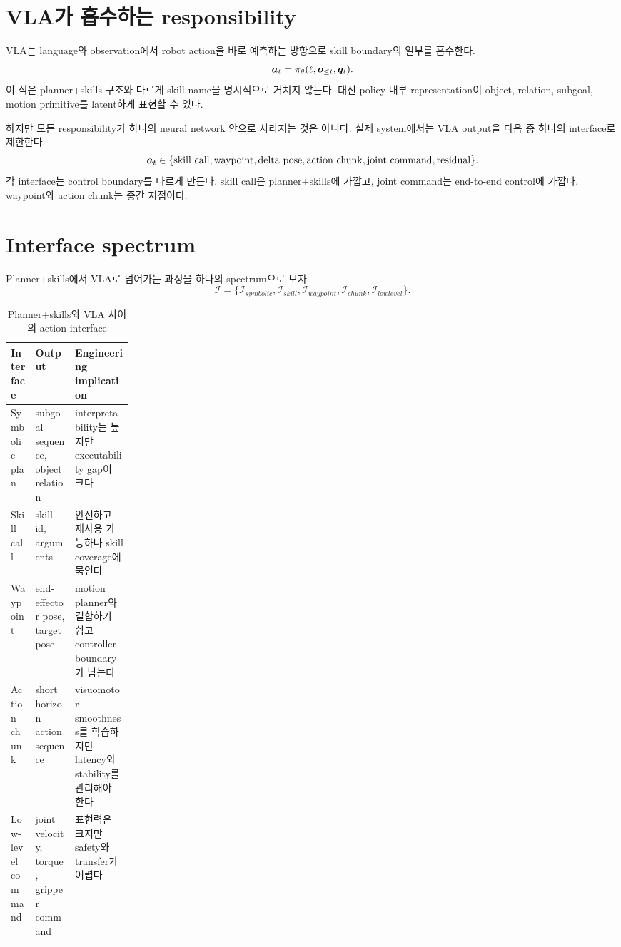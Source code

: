 \section{VLA가 흡수하는 responsibility}

VLA는 language와 observation에서 robot action을 바로 예측하는 방향으로 skill boundary의 일부를 흡수한다.
\begin{equation}
  \bm{a}_t
  =
  \pi_{\theta}(\ell,\bm{o}_{\leq t},\bm{q}_t).
  \label{eq:vla-policy-direct}
\end{equation}
이 식은 planner+skills 구조와 다르게 skill name을 명시적으로 거치지 않는다. 대신 policy 내부 representation이 object, relation, subgoal, motion primitive를 latent하게 표현할 수 있다.

하지만 모든 responsibility가 하나의 neural network 안으로 사라지는 것은 아니다. 실제 system에서는 VLA output을 다음 중 하나의 interface로 제한한다.
\begin{equation}
  \bm{a}_t
  \in
  \{\mathrm{skill\ call},\mathrm{waypoint},\mathrm{delta\ pose},
  \mathrm{action\ chunk},\mathrm{joint\ command},\mathrm{residual}\}.
  \label{eq:vla-interface-set}
\end{equation}
각 interface는 control boundary를 다르게 만든다. skill call은 planner+skills에 가깝고, joint command는 end-to-end control에 가깝다. waypoint와 action chunk는 중간 지점이다.

\section{Interface spectrum}

Planner+skills에서 VLA로 넘어가는 과정을 하나의 spectrum으로 보자.
\begin{equation}
  \mathcal{I}
  =
  \{\mathcal{I}_{symbolic},
  \mathcal{I}_{skill},
  \mathcal{I}_{waypoint},
  \mathcal{I}_{chunk},
  \mathcal{I}_{lowlevel}\}.
  \label{eq:interface-spectrum}
\end{equation}

\begin{table}[h]
  \centering
  \caption{Planner+skills와 VLA 사이의 action interface}
  \begin{tabularx}{\linewidth}{p{0.2\linewidth}X X}
    \toprule
    Interface & Output & Engineering implication \\
    \midrule
    Symbolic plan & subgoal sequence, object relation & interpretability는 높지만 executability gap이 크다 \\
    Skill call & skill id, arguments & 안전하고 재사용 가능하나 skill coverage에 묶인다 \\
    Waypoint & end-effector pose, target pose & motion planner와 결합하기 쉽고 controller boundary가 남는다 \\
    Action chunk & short horizon action sequence & visuomotor smoothness를 학습하지만 latency와 stability를 관리해야 한다 \\
    Low-level command & joint velocity, torque, gripper command & 표현력은 크지만 safety와 transfer가 어렵다 \\
    \bottomrule
  \end{tabularx}
  \label{tab:interface-spectrum}
\end{table}

